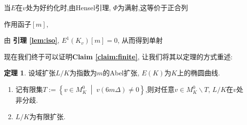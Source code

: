 \documentclass[12pt,A4paper,oneside,reqno]{amsart}
\numberwithin{equation}{section}
\theoremstyle{definition}
\newtheorem{theorem}{定理}[section]
\theoremstyle{plain}
\theoremstyle{plain}
\numberwithin{equation}{section}
\theoremstyle{remark}
\begin{document}
	当$E$在$v$处为好约化时,由Hensel引理, $\Phi$为满射,这等价于正合列
	\begin{center}
	\end{center}
作用函子$[m]$,
	\begin{center}
	\end{center}	
由 \textbf{引理 \ref{lem:iso}}, $E^1(K_v)[m]=0$, 从而得到单射
	\begin{center}
	\end{center}
现在我们终于可以证明\textbf{Claim \ref{claim:finite}}, 让我们将其以定理的方式重述:
\begin{theorem}\label{thm:ramify}
	设域扩张$L/K$为指数为$m$的Abel扩张, $E(K)$为$K$上的椭圆曲线.
	\begin{enumerate}[1.]
		\item 记有限集$T:=\left\{v \in M_K^0 \;\middle|\; v(6m\Delta) \neq 0 \right\}$,则对任意$v \in M_K^{0} \smallsetminus T$, $L/K$在$v$处非分歧.
		\item $L/K$为有限扩张.
	\end{enumerate}
\end{theorem}
\end{document}
